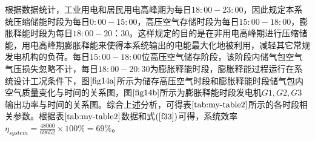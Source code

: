 \documentclass{jnuthesis}
\begin{document}
	\par 根据数据统计，工业用电和居民用电高峰期为每日$ 18:00-23:00 $，因此规定本系统压缩储能时段为每日$ 0:00-15:00 $，高压空气存储时段为每日$ 15:00-18:00 $，膨胀释能时段为每日$ 18:00-20：30 $。这样规定的目的是在非用电高峰期进行压缩储能，用电高峰期膨胀释能来使得本系统输出的电能最大化地被利用，减轻其它常规发电机构的负荷。每日$ 15:00-18:00 $位高压空气储存阶段，该阶段内储气包空气气压损失忽略不计，每日$ 18:00-20:30 $为膨胀释能时段，膨胀释能过程运行在系统设计工况条件下，图$ \ref{fig14a} $所示为储存高压空气时段和膨胀释能时段储气包内空气质量变化与时间的关系图，图$ \ref{fig14b} $所示为膨胀释能时段发电机$ G1,G2,G3 $输出功率与时间的关系图。综合上述分析，可得表$ \fontsize{10.5bp}{10pt}\ref{tab:my-table2} $所示的各时段相关参数。根据表$ \fontsize{10.5bp}{10pt}\ref{tab:my-table2} $数据和式$ (\fontsize{10.5bp}{10pt}\ref{f33}) $可得，系统效率$ \eta_{system}=\frac{48060}{69652} \times 100\%=69\% $。
	
\end{document}
